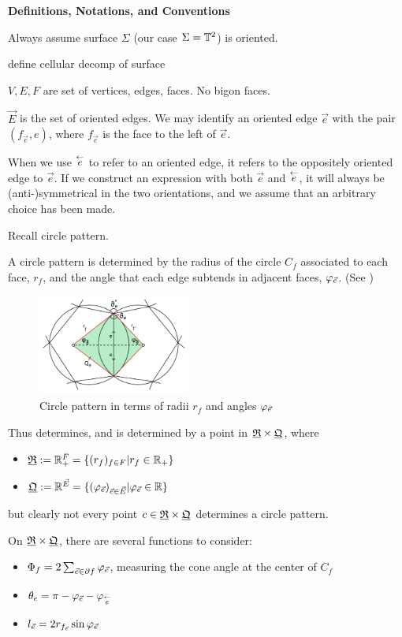 \textbf{Definitions, Notations, and Conventions}

Always assume surface $\Sigma$ (our case $\Sigma = {\mathbb{T}^2}$) is oriented.

define cellular decomp of surface

$V,E,F$ are set of vertices, edges, faces.
No bigon faces.

$\vec{E}$ is the set of oriented edges.
We may identify an oriented edge $\vec{e}$ with the pair $(f_{\vec{e}}, e)$,
where $f_{\vec{e}}$ is the face to the left of $\vec{e}$.

When we use $\overset{\leftarrow}{e}$ to refer to an oriented edge, it refers to
the oppositely oriented edge to $\vec{e}$.
If we construct an expression with both $\vec{e}$ and $\overset{\leftarrow}{e}$,
it will always be (anti-)symmetrical in the two orientations,
and we assume that an arbitrary choice has been made.



Recall circle pattern.

A circle pattern is determined by the radius of the circle $C_f$ associated to each face, $r_f$,
and the angle that each edge subtends in adjacent faces, $\varphi_{\vec{e}}$.
(See )
\begin{figure}
\includegraphics[width=5cm]{circle_pattern}
\caption{Circle pattern in terms of radii $r_f$ and angles $\varphi_{\vec{e}}$}
\label{f:circle_pattern}
\end{figure}
Thus determines, and is determined by a point in ${\underline{\mathfrak{R}}} \times {\underline{\mathfrak{Q}}}$, where

\begin{itemize}
	\item ${\underline{\mathfrak{R}}} := \mathbb{R}_+^F = \{(r_f)_{f\in F} | r_f \in \mathbb{R}_+\}$
	\item ${\underline{\mathfrak{Q}}} := \mathbb{R}^{\vec{E}} =
		\{(\varphi_{\vec{e}})_{\vec{e} \in \vec{E}} | \varphi_{\vec{e}} \in \mathbb{R}\}$
\end{itemize}
but clearly not every point $c\in {\underline{\mathfrak{R}}} \times {\underline{\mathfrak{Q}}}$ determines a circle pattern.


On ${\underline{\mathfrak{R}}} \times {\underline{\mathfrak{Q}}}$, there are several functions to consider:
\begin{itemize}
	\item $\Phi_f = 2 \sum_{\vec{e} \in \partial f} \varphi_{\vec{e}}$, measuring the cone angle
		at the center of $C_f$
	\item $\theta_e = \pi - \varphi_{\vec{e}} - \varphi_{\overset{\leftarrow}{e}}$
	\item $l_{\vec{e}} = 2 r_{f_{\vec{e}}} \sin \varphi_{\vec{e}}$
\end{itemize}

